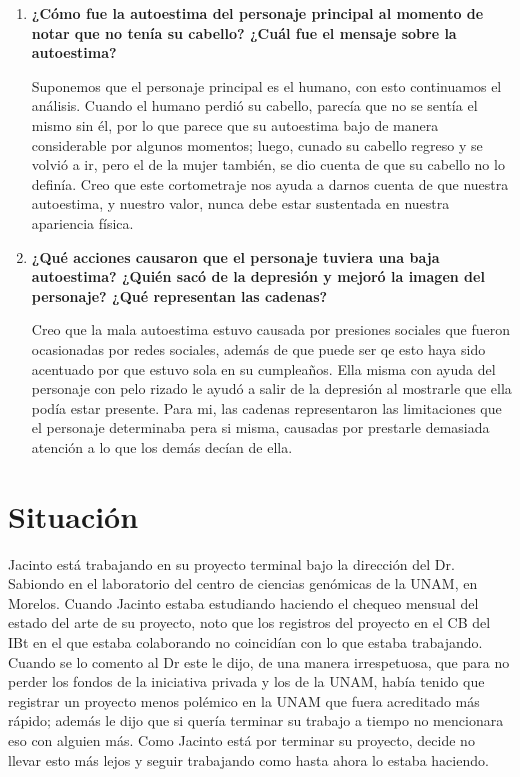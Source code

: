 \documentclass[12pt]{article}
\begin{document}
\begin{enumerate}
	\item \textbf{ ¿Cómo fue la autoestima del personaje principal al momento de notar que no tenía su cabello? ¿Cuál fue el mensaje sobre la autoestima? }
	
	Suponemos que el personaje principal es el humano, con esto continuamos el análisis. Cuando el humano perdió su cabello, parecía que no se sentía el mismo sin él, por lo que parece que su autoestima bajo de manera considerable por algunos momentos; luego, cunado su cabello regreso y se volvió a ir, pero el de la mujer también, se dio cuenta de que su cabello no lo definía. Creo que este cortometraje nos ayuda a darnos cuenta de que nuestra autoestima, y nuestro valor, nunca debe estar sustentada en nuestra apariencia física.
	
	\item \textbf{ ¿Qué acciones causaron que el personaje tuviera una baja autoestima? ¿Quién sacó de la depresión y mejoró la imagen del personaje? ¿Qué representan las cadenas? }
	
	Creo que la mala autoestima estuvo causada por presiones sociales que fueron ocasionadas por redes sociales, además de que puede ser qe esto haya sido acentuado por que estuvo sola en su cumpleaños. Ella misma con ayuda del personaje con pelo rizado le ayudó a salir de la depresión al mostrarle que ella podía estar presente. Para mi, las cadenas representaron las limitaciones que el personaje determinaba pera si misma, causadas por prestarle demasiada atención a lo que los demás decían de ella.
	
\end{enumerate}



\section{Situación}

	\par Jacinto está trabajando en su proyecto terminal bajo la dirección del Dr. Sabiondo en el laboratorio del centro de ciencias genómicas de la UNAM, en Morelos. Cuando Jacinto estaba estudiando haciendo el chequeo mensual del estado del arte de su proyecto, noto que los registros del proyecto en el CB del IBt en el que estaba colaborando no coincidían con lo que estaba trabajando. Cuando se lo comento al Dr este le dijo, de una manera irrespetuosa, que para no perder los fondos de la iniciativa privada y los de la UNAM, había tenido que registrar un proyecto menos polémico en la UNAM que fuera acreditado más rápido; además le dijo que si quería terminar su trabajo a tiempo no mencionara eso con alguien más. Como Jacinto está por terminar su proyecto, decide no llevar esto más lejos y seguir trabajando como hasta ahora lo estaba haciendo.
\end{document}
